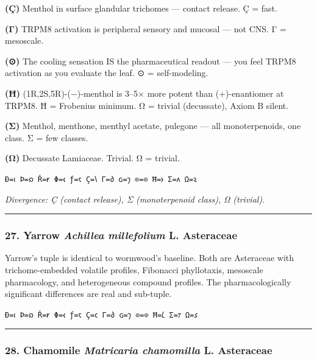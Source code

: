 \textbf{(Ç)} Menthol in surface glandular trichomes --- contact release.
Ç = fast.

\textbf{(Γ)} TRPM8 activation is peripheral sensory and mucosal --- not
CNS. Γ = mesoscale.

\textbf{(⊙)} The cooling sensation IS the pharmaceutical readout --- you
feel TRPM8 activation as you evaluate the leaf. ⊙ = self-modeling.

\textbf{(Ħ)} (1R,2S,5R)-(−)-menthol is 3--5× more potent than
(+)-enantiomer at TRPM8. Ħ = Frobenius minimum. Ω = trivial (decussate),
Axiom B silent.

\textbf{(Σ)} Menthol, menthone, menthyl acetate, pulegone --- all
monoterpenoids, one class. Σ = few classes.

\textbf{(Ω)} Decussate Lamiaceae. Trivial. Ω = trivial.

\texttt{Ð=𐑦\ Þ=𐑸\ Ř=𐑾\ Φ=𐑬\ ƒ=𐑱\ Ç=𐑘\ Γ=𐑔\ ɢ=𐑠\ ⊙=⊙\ Ħ=𐑶\ Σ=𐑵\ Ω=𐑷}

\emph{Divergence: Ç (contact release), Σ (monoterpenoid class), Ω
(trivial).}

\begin{center}\rule{0.5\linewidth}{0.5pt}\end{center}

\hypertarget{yarrow-achillea-millefolium-l.-asteraceae}{%
\subsubsection{\texorpdfstring{27. Yarrow \textbar{} \emph{Achillea
millefolium} L. \textbar{}
Asteraceae}{27. Yarrow \textbar{} Achillea millefolium L. \textbar{} Asteraceae}}\label{yarrow-achillea-millefolium-l.-asteraceae}}

Yarrow's tuple is identical to wormwood's baseline. Both are Asteraceae
with trichome-embedded volatile profiles, Fibonacci phyllotaxis,
mesoscale pharmacology, and heterogeneous compound profiles. The
pharmacologically significant differences are real and sub-tuple.

\texttt{Ð=𐑦\ Þ=𐑸\ Ř=𐑾\ Φ=𐑬\ ƒ=𐑱\ Ç=𐑤\ Γ=𐑔\ ɢ=𐑠\ ⊙=⊙\ Ħ=𐑖\ Σ=𐑳\ Ω=𐑭}

\begin{center}\rule{0.5\linewidth}{0.5pt}\end{center}

\hypertarget{chamomile-matricaria-chamomilla-l.-asteraceae}{%
\subsubsection{\texorpdfstring{28. Chamomile \textbar{} \emph{Matricaria
chamomilla} L. \textbar{}
Asteraceae}{28. Chamomile \textbar{} Matricaria chamomilla L. \textbar{} Asteraceae}}\label{chamomile-matricaria-chamomilla-l.-asteraceae}}

